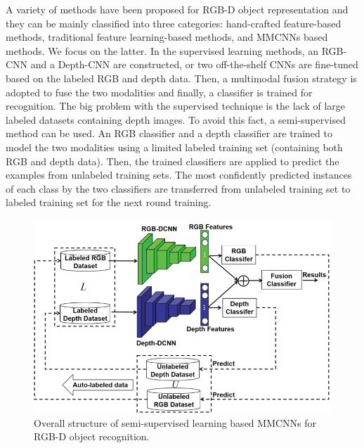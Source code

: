 A variety of methods have been proposed for RGB-D object representation and they can be mainly classified into three categories: hand-crafted feature-based methods, traditional feature learning-based methods, and MMCNNs based methods. We focus on the latter. In the supervised learning methods, an RGB-CNN and a Depth-CNN are constructed, or two off-the-shelf CNNs are fine-tuned based on the labeled RGB and depth data. Then, a multimodal fusion strategy is adopted to fuse the two modalities and finally, a classifier is trained for recognition.
The big problem with the supervised technique is the lack of large labeled datasets containing depth images. To avoid this fact, a semi-supervised method can be used. An RGB classifier and a depth classifier are trained to model the two modalities using a limited labeled training set (containing both RGB and depth data). Then, the trained classifiers are applied to
predict the examples from unlabeled training sets. The most confidently predicted instances of each class by
the two classifiers are transferred from unlabeled training set to labeled training set for the next round training.

\begin{figure}[h!]
	\centering
	\includegraphics[width=0.8\linewidth]{images/cnn_semi_supervised.png}
	\caption{Overall structure of semi-supervised learning based MMCNNs
		for RGB-D object recognition.}
\end{figure} 

